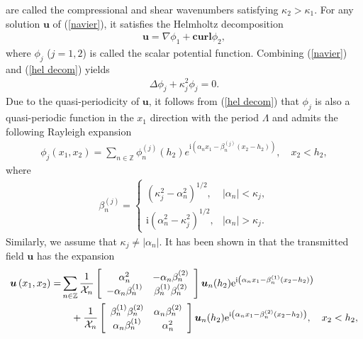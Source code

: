 \documentclass[final,3p,times]{elsarticle}
\begin{document}
are called the compressional and shear wavenumbers satisfying $\kappa_2>\kappa_1$. For any solution $\boldsymbol{u}$ of (\ref{navier}), it satisfies the Helmholtz decomposition
\begin{align} \label{hel decom}
	\boldsymbol{u}=\nabla \phi_1+\textbf{curl} \phi_2,
\end{align}
where $\phi_j$ ($j=1,2$) is called the scalar potential function.
Combining (\ref{navier}) and (\ref{hel decom}) yields 
\begin{align*}
	\Delta \phi_j+\kappa_j^2 \phi_j=0.
\end{align*}
Due to  the quasi-periodicity of $\boldsymbol{u}$, it follows from (\ref{hel decom}) that $\phi_j$ is also a quasi-periodic function in the $x_1$ direction with the period $\Lambda$ and admits the following Rayleigh expansion
\begin{align*}
	\phi_j\left(x_1, x_2\right)=\sum_{n \in \mathbb{Z}} \phi_n^{(j)}(h_2) e^{\mathrm{i}\left(\alpha_n x_1-\beta_n^{(j)}\left(x_2-h_2\right)\right)}, \quad x_2<h_2,
\end{align*}
where
\begin{align*}
	\beta_n^{(j)}= \begin{cases}\left(\kappa_j^2-\alpha_n^2\right)^{1 / 2}, & \left|\alpha_n\right|<\kappa_j, \\ \mathrm{i}\left(\alpha_n^2-\kappa_j^2\right)^{1 / 2}, & \left|\alpha_n\right|>\kappa_j.\end{cases}
\end{align*}
Similarly, we assume that $\kappa_j \neq\left|\alpha_n\right|$. 
It has been shown in \cite{Lin25} that the transmitted field $\boldsymbol{u}$ has the expansion
\begin{align}\label{urexp}
	\boldsymbol{u}\left(x_1, x_2\right)= & \sum_{n \in \mathbb{Z}} \frac{1}{\mathcal{X}_{n}}\left[\begin{array}{cc}
		\alpha_n^2 & -\alpha_n \beta_n^{(2)} \\
		-\alpha_n \beta_n^{(1)} & \beta_n^{(1)} \beta_n^{(2)}
	\end{array}\right] \boldsymbol{u}_n(h_2) \mathrm{e}^{\mathrm{i}\left(\alpha_n x_1-\beta_n^{(1)}\left(x_2-h_2\right)\right)} \notag\\
	& \quad +\frac{1}{\mathcal{X}_{n}}\left[\begin{array}{cc}
		\beta_n^{(1)} \beta_n^{(2)} & \alpha_n \beta_n^{(2)} \\
		\alpha_n \beta_n^{(1)} & \alpha_n^2
	\end{array}\right] \boldsymbol{u}_n(h_2) \mathrm{e}^{\mathrm{i}\left(\alpha_n x_1-\beta_n^{(2)}\left(x_2-h_2\right)\right)}, \quad x_2<h_2,
\end{align}
\end{document}
